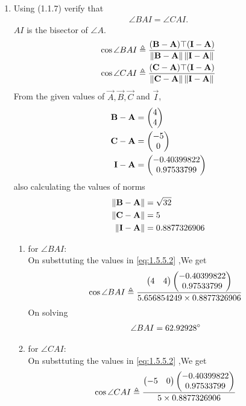\documentclass[11pt]{book}
\begin{document}
\begin{enumerate}[label=\thesection.\arabic*.,ref=\thesection.\theenumi]
\item Using (1.1.7) verify that 
\begin{align}
\angle BAI = \angle CAI.
\end{align}
$AI$ is the bisector of $\angle A$. \\
\solution
\begin{align}
\label{eq:1.5.5.2}
\cos{\angle BAI} \triangleq \frac{(\vec{B}-\vec{A})\top(\vec{I}-\vec{A})}{\norm{\vec{B}-\vec{A}}\norm{\vec{I}-\vec{A}}} \\
\cos{\angle CAI} \triangleq \frac{(\vec{C}-\vec{A})\top(\vec{I}-\vec{A})}{\norm{\vec{C}-\vec{A}}\norm{\vec{I}-\vec{A}}} 
\end{align}
From the given values of $\vec{A},\vec{B},\vec{C}$ and $\vec{I}$,
\begin{align}
	\mathbf{B}-\mathbf{A} &=\begin{pmatrix}4\\4\end{pmatrix} \\
	\mathbf{C}-\mathbf{A}&= \begin{pmatrix}-5\\0\end{pmatrix} \\
 \mathbf{I}-\mathbf{A}  &=\begin{pmatrix}-0.40399822 \\ 0.97533799\end{pmatrix}
\end{align}
also calculating the values of norms
\begin{align}
	\left\lVert\mathbf{B}-\mathbf{A}\right\rVert &= \sqrt{32} \\
	\left\lVert\mathbf{C}-\mathbf{A}\right\rVert &= 5 \\
 	\left\lVert\mathbf{I}-\mathbf{A}\right\rVert &=  0.8877326906\\
\end{align}
\begin{enumerate}
    \item for $\angle BAI$: \\
    On substtuting the values in  \eqref{eq:1.5.5.2} ,We get 
    \begin{align}
	    \cos{\angle BAI} \triangleq \frac{\begin{pmatrix} 4 & 4\end{pmatrix}\begin{pmatrix}-0.40399822 \\ 0.97533799\end{pmatrix}}{ 5.656854249\times 0.8877326906 } \\
    \end{align}
    On solving 
    \begin{align}
        \angle BAI = 62.92928\degree
    \end{align}
       \item for $\angle CAI$: \\
    On substtuting the values in  \eqref{eq:1.5.5.2} ,We get 
    \begin{align}
        \cos{\angle CAI} \triangleq \frac{\myvec{ -5 & 0}\myvec{-0.40399822 \\ 0.97533799}}{5\times 0.8877326906} \\

\end{align}
\end{enumerate}
\end{enumerate}
\end{document}
